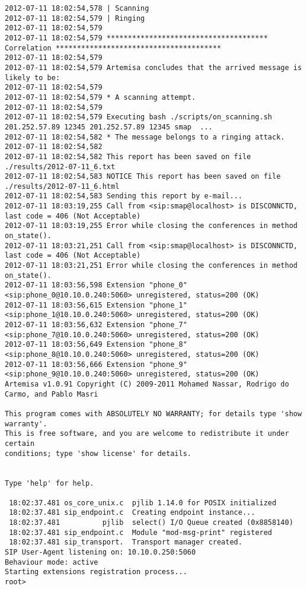 \documentclass[a4paper,12pt]{report}
\newenvironment{mytinylisting}
{\begin{list}{}{\setlength{\leftmargin}{1em}}\item\tiny\bfseries}
{\end{list}}
\begin{document}
\begin{mytinylisting}
\begin{verbatim}
2012-07-11 18:02:54,578 | Scanning
2012-07-11 18:02:54,579 | Ringing
2012-07-11 18:02:54,579 
2012-07-11 18:02:54,579 ************************************** Correlation ***************************************
2012-07-11 18:02:54,579 
2012-07-11 18:02:54,579 Artemisa concludes that the arrived message is likely to be:
2012-07-11 18:02:54,579 
2012-07-11 18:02:54,579 * A scanning attempt.
2012-07-11 18:02:54,579 
2012-07-11 18:02:54,579 Executing bash ./scripts/on_scanning.sh 201.252.57.89 12345 201.252.57.89 12345 smap  ...
2012-07-11 18:02:54,582 * The message belongs to a ringing attack.
2012-07-11 18:02:54,582 
2012-07-11 18:02:54,582 This report has been saved on file ./results/2012-07-11_6.txt
2012-07-11 18:02:54,583 NOTICE This report has been saved on file ./results/2012-07-11_6.html
2012-07-11 18:02:54,583 Sending this report by e-mail...
2012-07-11 18:03:19,255 Call from <sip:smap@localhost> is DISCONNCTD, last code = 406 (Not Acceptable)
2012-07-11 18:03:19,255 Error while closing the conferences in method on_state().
2012-07-11 18:03:21,251 Call from <sip:smap@localhost> is DISCONNCTD, last code = 406 (Not Acceptable)
2012-07-11 18:03:21,251 Error while closing the conferences in method on_state().
2012-07-11 18:03:56,598 Extension "phone_0" <sip:phone_0@10.10.0.240:5060> unregistered, status=200 (OK)
2012-07-11 18:03:56,615 Extension "phone_1" <sip:phone_1@10.10.0.240:5060> unregistered, status=200 (OK)
2012-07-11 18:03:56,632 Extension "phone_7" <sip:phone_7@10.10.0.240:5060> unregistered, status=200 (OK)
2012-07-11 18:03:56,649 Extension "phone_8" <sip:phone_8@10.10.0.240:5060> unregistered, status=200 (OK)
2012-07-11 18:03:56,666 Extension "phone_9" <sip:phone_9@10.10.0.240:5060> unregistered, status=200 (OK)
Artemisa v1.0.91 Copyright (C) 2009-2011 Mohamed Nassar, Rodrigo do Carmo, and Pablo Masri

This program comes with ABSOLUTELY NO WARRANTY; for details type 'show warranty'.
This is free software, and you are welcome to redistribute it under certain
conditions; type 'show license' for details.


Type 'help' for help.

 18:02:37.481 os_core_unix.c  pjlib 1.14.0 for POSIX initialized
 18:02:37.481 sip_endpoint.c  Creating endpoint instance...
 18:02:37.481          pjlib  select() I/O Queue created (0x8858140)
 18:02:37.481 sip_endpoint.c  Module "mod-msg-print" registered
 18:02:37.481 sip_transport.  Transport manager created.
SIP User-Agent listening on: 10.10.0.250:5060
Behaviour mode: active
Starting extensions registration process...
root> 
 \end{verbatim}
\end{mytinylisting}
\end{document}
